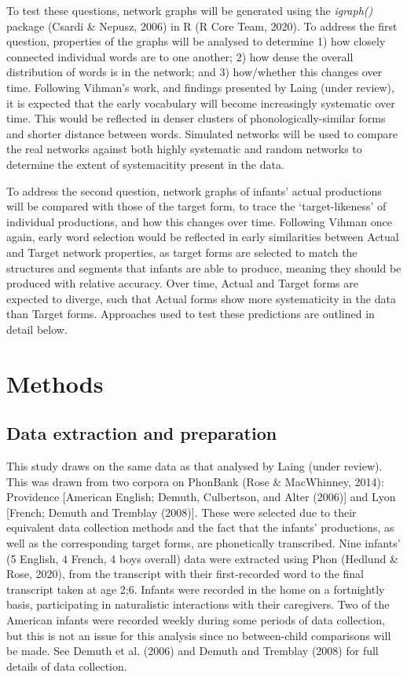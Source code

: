 \documentclass[
  man]{apa6}
\begin{document}
To test these questions, network graphs will be generated using the \emph{igraph()} package (Csardi \& Nepusz, 2006) in R (R Core Team, 2020). To address the first question, properties of the graphs will be analysed to determine 1) how closely connected individual words are to one another; 2) how dense the overall distribution of words is in the network; and 3) how/whether this changes over time. Following Vihman's work, and findings presented by Laing (under review), it is expected that the early vocabulary will become increasingly systematic over time. This would be reflected in denser clusters of phonologically-similar forms and shorter distance between words. Simulated networks will be used to compare the real networks against both highly systematic and random networks to determine the extent of systemacitity present in the data.

To address the second question, network graphs of infants' actual productions will be compared with those of the target form, to trace the `target-likeness' of individual productions, and how this changes over time. Following Vihman once again, early word selection would be reflected in early similarities between Actual and Target network properties, as target forms are selected to match the structures and segments that infants are able to produce, meaning they should be produced with relative accuracy. Over time, Actual and Target forms are expected to diverge, such that Actual forms show more systematicity in the data than Target forms. Approaches used to test these predictions are outlined in detail below.

\hypertarget{methods}{%
\section{Methods}\label{methods}}

\hypertarget{data-extraction-and-preparation}{%
\subsection{Data extraction and preparation}\label{data-extraction-and-preparation}}

This study draws on the same data as that analysed by Laing (under review). This was drawn from two corpora on PhonBank (Rose \& MacWhinney, 2014): Providence {[}American English; Demuth, Culbertson, and Alter (2006){]} and Lyon {[}French; Demuth and Tremblay (2008){]}. These were selected due to their equivalent data collection methods and the fact that the infants' productions, as well as the corresponding target forms, are phonetically transcribed. Nine infants' (5 English, 4 French, 4 boys overall) data were extracted using Phon (Hedlund \& Rose, 2020), from the transcript with their first-recorded word to the final transcript taken at age 2;6. Infants were recorded in the home on a fortnightly basis, participating in naturalistic interactions with their caregivers. Two of the American infants were recorded weekly during some periods of data collection, but this is not an issue for this analysis since no between-child comparisons will be made. See Demuth et al. (2006) and Demuth and Tremblay (2008) for full details of data collection.
\end{document}
